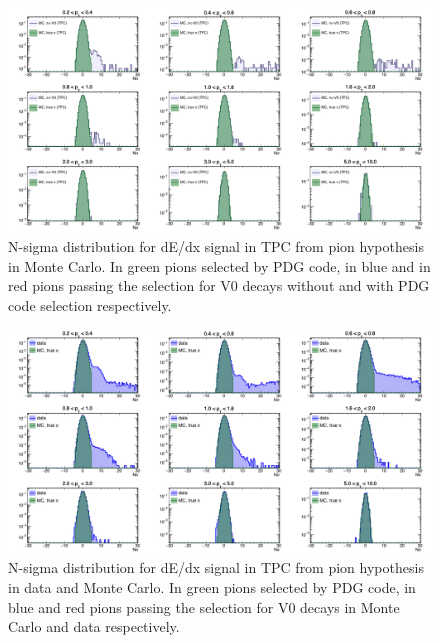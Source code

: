 \begin{figure}[!h]
 \centering
 \includegraphics[angle=0, width=15cm]{./FigCap5/PionTPC_MC.png}
 \caption{N-sigma distribution for dE/dx signal in TPC from pion hypothesis in Monte Carlo. In green pions selected by PDG code, in blue and in red pions passing the selection for V0 decays without and with PDG code selection respectively.}
 \label{fig:MCPionsTPC} 
\end{figure}

\begin{figure}[!h]
 \centering
 \includegraphics[angle=0, width=15cm]{./FigCap5/PionTPC_DataMC.png}
 \caption{N-sigma distribution for dE/dx signal in TPC from pion hypothesis in data and Monte Carlo. In green pions selected by PDG code, in blue and red pions passing the selection for V0 decays in Monte Carlo and data respectively.}
 \label{fig:DataPionsTPC} 
\end{figure}

